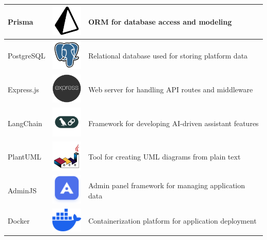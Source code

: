 \begin{longtable}{|m{3.5cm}|m{4cm}|m{6.5cm}|}
    \hline
    Prisma & \includegraphics[width=1.5cm]{pictures/web/logo/prisma.png} & ORM for database access and modeling \\
    \hline
    PostgreSQL & \includegraphics[width=1.5cm]{pictures/web/logo/pgsql-svgrepo-com.png} & Relational database used for storing platform data \\
    \hline
    Express.js & \includegraphics[width=1.5cm]{pictures/web/logo/express-js.png} & Web server for handling API routes and middleware \\
    \hline
    LangChain & \includegraphics[width=1.5cm]{pictures/web/logo/langchain-icon-seeklogo.png} & Framework for developing AI-driven assistant features \\
    \hline
    PlantUML & \includegraphics[width=1.5cm]{pictures/web/logo/plantuml-svgrepo-com.png} & Tool for creating UML diagrams from plain text \\
    \hline
    AdminJS & \includegraphics[width=1.5cm]{pictures/web/logo/admin-js.png} & Admin panel framework for managing application data \\
    \hline
    Docker & \includegraphics[width=1.5cm]{pictures/web/logo/docker.png} & Containerization platform for application deployment \\

\end{longtable}
